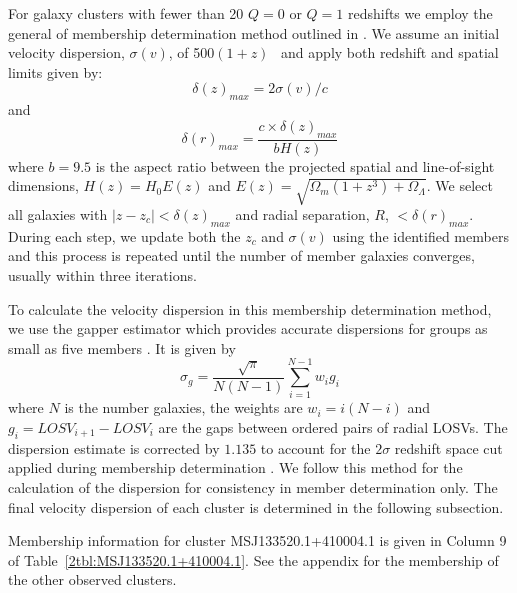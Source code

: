 For galaxy clusters with fewer than 20 $Q=0$ or $Q=1$ redshifts we employ the general of membership determination method outlined in \cite{Wilman2005, Connelly2012}. We assume an initial velocity dispersion, $\sigma(v)$, of 500$(1+z)$ \kms\ and apply both redshift and spatial limits given by: 
\begin{equation}
	\delta(z)_{max} = 2 \sigma(v)/c 
\end{equation}
and 
\begin{equation}
	\delta(r)_{max} = \frac{c\times\delta(z)_{max}}{bH(z)} 
\end{equation}
where $b=9.5$ is the aspect ratio between the projected spatial and line-of-sight dimensions, $H(z) = H_0 E(z)$ and $E(z) = \sqrt{\Omega_m(1+z^3)+\Omega_{\Lambda}}$. We select all galaxies with $|z-z_c| < \delta(z)_{max}$ and radial separation, $R$, $<\delta(r)_{max}$. During each step, we update both the $z_c$ and $\sigma(v)$ using the identified members and this process is repeated until the number of member galaxies converges, usually within three iterations.

To calculate the velocity dispersion in this membership determination method, we use the gapper estimator \citep{Beers1990} which provides accurate dispersions for groups as small as five members \citep{Hou2009}. It is given by 
\begin{equation}
	\sigma_g = \frac{\sqrt{\pi}}{N(N-1)} \sum_{i=1}^{N-1} w_i g_i
\end{equation}
where $N$ is the number galaxies, the weights are $w_i = i(N-i)$ and $g_i = LOSV_{i+1} - LOSV_i$ are the gaps between ordered pairs of radial LOSVs. The dispersion estimate is corrected by $1.135$ to account for the $2\sigma$ redshift space cut applied during membership determination \citep{Connelly2012}. We follow this method for the calculation of the dispersion for consistency in member determination only. The final velocity dispersion of each cluster is determined in the following subsection.

Membership information for cluster MSJ133520.1+410004.1 is given in Column 9 of Table~\ref{2tbl:MSJ133520.1+410004.1}. See the appendix for the membership of the other observed clusters.

